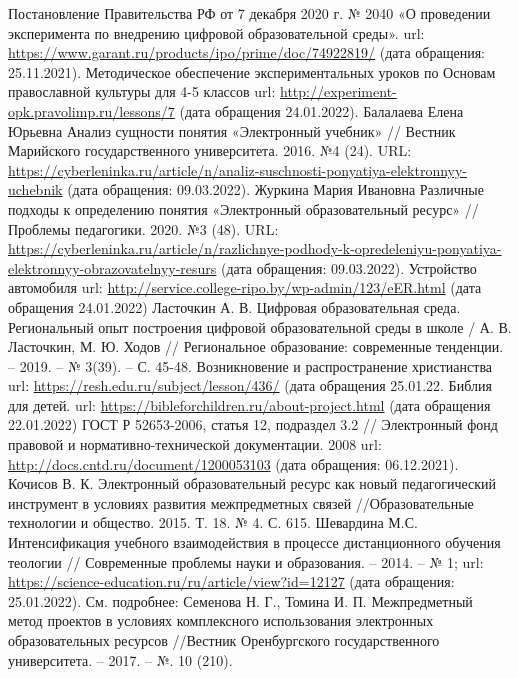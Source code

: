 \newpage
\large
\begin{thebibliography}{99}
  Постановление Правительства РФ от 7 декабря 2020 г. № 2040 «О проведении эксперимента по внедрению цифровой образовательной среды». url: \url{https://www.garant.ru/products/ipo/prime/doc/74922819/} (дата обращения: 25.11.2021).
  Методическое обеспечение экспериментальных уроков по Основам православной культуры для 4-5 классов url: \url{http://experiment-opk.pravolimp.ru/lessons/7} (дата обращения 24.01.2022).
 Балалаева Елена Юрьевна Анализ сущности понятия «Электронный учебник» // Вестник Марийского государственного университета. 2016. №4 (24). URL: \url{https://cyberleninka.ru/article/n/analiz-suschnosti-ponyatiya-elektronnyy-uchebnik} (дата обращения: 09.03.2022).
Журкина Мария Ивановна Различные подходы к определению понятия «Электронный образовательный ресурс» // Проблемы педагогики. 2020. №3 (48). URL: \url {https://cyberleninka.ru/article/n/razlichnye-podhody-k-opredeleniyu-ponyatiya-elektronnyy-obrazovatelnyy-resurs} (дата обращения: 09.03.2022).
  Устройство автомобиля url: \url{http://service.college-ripo.by/wp-admin/123/eER.html} (дата обращения 24.01.2022)
  Ласточкин А. В. Цифровая образовательная среда. Региональный опыт построения цифровой образовательной среды в школе / А. В. Ласточкин, М. Ю. Ходов // Региональное образование: современные тенденции. – 2019. – № 3(39). – С. 45-48.
  Возникновение и распространение христианства url: \url{https://resh.edu.ru/subject/lesson/436/} (дата обращения 25.01.22.
  Библия для детей. url: \url{https://bibleforchildren.ru/about-project.html} (дата обращения 22.01.2022)
  ГОСТ Р 52653-2006, статья 12, подраздел 3.2 // Электронный фонд правовой и нормативно-технической документации. 2008 url: \url{http://docs.cntd.ru/document/1200053103} (дата обращения: 06.12.2021).
  Кочисов В. К. Электронный образовательный ресурс как новый педагогический инструмент в условиях развития межпредметных связей //Образовательные технологии и общество. 2015. Т. 18. № 4. С. 615.
  Шевардина М.С. Интенсификация учебного взаимодействия в процессе дистанционного обучения теологии // Современные проблемы науки и образования. – 2014. – № 1; url: \url{https://science-education.ru/ru/article/view?id=12127} (дата обращения: 25.01.2022).
  См. подробнее: Семенова Н. Г., Томина И. П. Межпредметный метод проектов в условиях комплексного использования электронных образовательных ресурсов //Вестник Оренбургского государственного университета. – 2017. – №. 10 (210).

\end{thebibliography}

